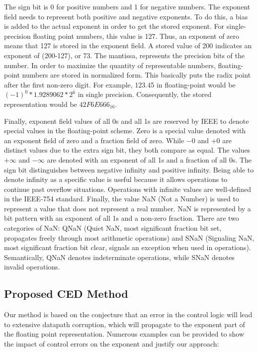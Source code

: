 \documentclass[12pt]{yalephd}
\begin{document}
The sign bit is 0 for positive numbers and 1 for negative numbers. The exponent field needs to represent both positive and negative exponents. To do this, a bias is added to the actual exponent in order to get the stored exponent. For single-precision floating point numbers, this value is 127. Thus, an exponent of zero means that 127 is stored in the exponent field. A stored value of 200 indicates an exponent of (200-127), or 73. The mantissa, represents the precision bits of the number. In order to maximize the quantity of representable numbers, floating-point numbers are stored in normalized form. This basically puts the radix point after the first non-zero digit. For example, 123.45 in floating-point would be $(-1)^{0} * 1.{9289062} * 2^{6}$ in single precision. Consequently, the stored representation would be $42F6E666_{16}$.

Finally, exponent field values of all 0s and all 1s are reserved by IEEE to denote special values in the floating-point scheme. Zero is a special value denoted with an exponent field of zero and a fraction field of zero. While $-0$ and $+0$ are distinct values due to the extra sign bit, they both compare as equal. The values $+\infty$ and $-\infty$ are denoted with an exponent of all 1s and a fraction of all 0s. The sign bit distinguishes between negative infinity and positive infinity. Being able to denote infinity as a specific value is useful because it allows operations to continue past overflow situations. Operations with infinite values are well-defined in the IEEE-754 standard. Finally, the value NaN (Not a Number) is used to represent a value that does not represent a real number. NaN is represented by a bit pattern with an exponent of all 1s and a non-zero fraction. There are two categories of NaN: QNaN (Quiet NaN, most significant fraction bit set, propagates freely through most arithmetic operations) and SNaN (Signaling NaN, most significant fraction bit clear, signals an exception when used in operations). Semantically, QNaN denotes indeterminate operations, while SNaN denotes invalid operations.

\subsection{Proposed CED Method}\label{sC3sFCED}

Our method is based on the conjecture that an error in the control logic will lead to extensive datapath corruption, which will propagate to the exponent part of the floating point representation. Numerous examples can be provided to show the impact of control errors on the exponent and justify our approach:
\end{document}
